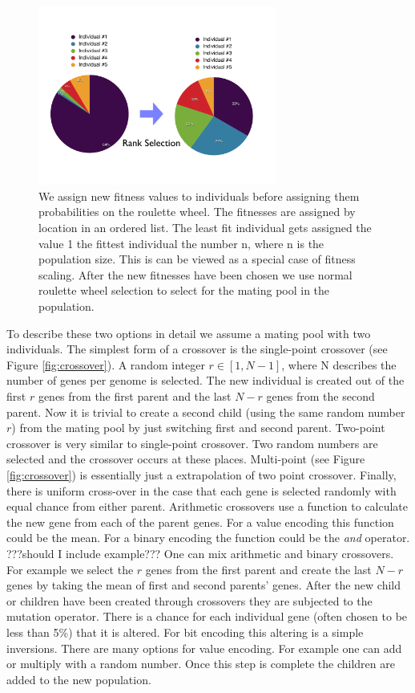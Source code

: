 \begin{figure}[htbp] %
   \centering
   \includegraphics[width=0.7\textwidth]{chapter_dalek/plots/rank_select.pdf} 
   \caption{We assign new fitness values to individuals before assigning them probabilities on the roulette wheel. The fitnesses are assigned by location in an ordered list. The least fit individual gets assigned the value 1 the fittest individual the number n, where n is the population size. This is can be viewed as a special case of fitness scaling. After the new fitnesses have been chosen we use normal roulette wheel selection to select for the mating pool in the population. }
   \label{fig:rankselection}
\end{figure}

To describe these two options in detail we assume a mating pool with two individuals. The simplest form of a crossover is the single-point crossover (see Figure \ref{fig:crossover}). A random integer $r \in [1,N-1]$, where N describes the number of genes per genome is selected. The new individual is created out of the first $r$ genes from the first parent and the last $N-r$ genes from the second parent. Now it is trivial to create a second child (using the same random number $r$) from the mating pool by just switching first and second parent. 
Two-point crossover is very similar to single-point crossover. Two random numbers are selected and the crossover occurs at these places. Multi-point (see Figure \ref{fig:crossover}) is essentially just a extrapolation of two point crossover. Finally, there is uniform cross-over in the case that each gene is selected randomly with equal chance from either parent.
Arithmetic crossovers use a function to calculate the new gene from each of the parent genes. For a value encoding this function could be the mean. For a binary encoding the function could be the \textit{and} operator. ???should I include example???
One can mix arithmetic and binary crossovers. For example we select the $r$ genes from the first parent and create the last $N-r$ genes by taking the mean of first and second parents' genes. 
After the new child or children have been created through crossovers they are subjected to the mutation operator. There is a chance for each individual gene (often chosen to be less than 5\%) that it is altered. For bit encoding this altering is a simple inversions. There are many options for value encoding. For example one can add or multiply with a random number. 
Once this step is complete the children are added to the new population.

